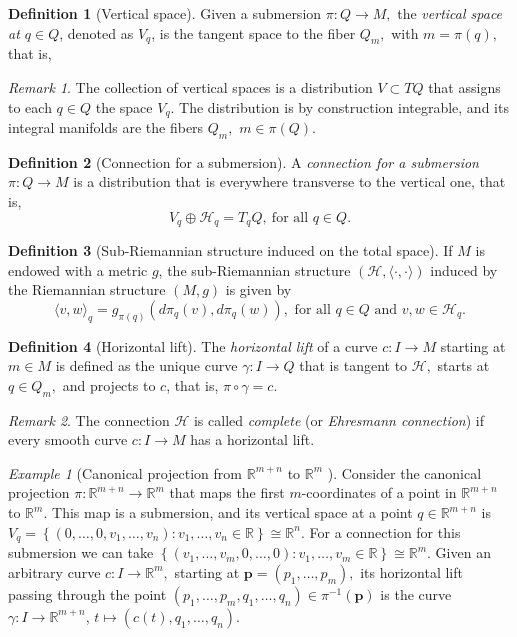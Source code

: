 \documentclass [xcolor=svgnames, t] {beamer}
\theoremstyle{definition}
\newtheorem{df}{Definition}
\theoremstyle{plain}
\theoremstyle{remark}
\newtheorem{ex}{Example}
\newtheorem{rem}{Remark}
\begin{document}
\begin{frame}[allowframebreaks]
	\begin{df}[Vertical space]
	Given a submersion $ \pi:Q \rightarrow {M}, $ the \textit{vertical space at $ q\in Q $}, denoted as $ V_q $, is the tangent space to the fiber $ Q_m, $ with $ m=\pi(q), $ that is,  
	\end{df}
	\begin{rem}
The collection of vertical spaces is a distribution $ V \subset TQ $ that assigns to each $ q\in Q $ the space $ V_q. $ The distribution is by construction integrable, and its integral manifolds are the fibers $ Q_m, $ $ m\in \pi(Q). $ 
	\end{rem}
	\begin{df}[Connection for a submersion]
	A \textit{connection for a submersion} $ \pi:Q \rightarrow {M} $ is a distribution that is everywhere transverse to the vertical one, that is,  
	$$ V_q \oplus \mathcal{H}_q = T_q Q,\ \text{for all } q\in Q. $$ 
	\end{df}
	\begin{df}[Sub-Riemannian structure induced on the total space]
	If $ M $ is endowed with a metric $ g $, the sub-Riemannian structure $ (\mathcal{H},\langle \cdot, \cdot\rangle) $ induced by the Riemannian structure $ (M,g) $ is given by
$$ \langle v,w \rangle_q = g_{\pi(q)} \left( d\pi_q(v), d\pi_q(w) \right), \text{ for all }q\in Q \text{ and } v,w\in \mathcal{H}_q.   $$ 
	\end{df}
	\begin{df}[Horizontal lift]
	The \textit{horizontal lift} of a curve $ c: I \rightarrow {M} $ starting at $ m\in M $ is defined as the unique curve $ \gamma : I \rightarrow {Q} $ that is tangent to $ \mathcal{H}, $ starts at $ q\in Q_m, $ and projects to $c$, that is, $ \pi\circ\gamma = c. $ 
	\end{df}
\begin{rem}
	The connection $ \mathcal{H} $ is called \textit{complete} (or \textit{Ehresmann connection})  if every smooth curve $ c: I \rightarrow {M} $ has a horizontal lift.
\end{rem}
\begin{ex}[Canonical projection from $ \mathbb{R}^{m+n} $ to $ \mathbb{R}^m $  ]\label{ex:can_proj}
	\sloppy	Consider the canonical projection $ \pi: \mathbb{R}^{m+n} \rightarrow \mathbb{R}^m $ that maps the first $ m $-coordinates of a point in $ \mathbb{R}^{m+n} $  to $ \mathbb{R}^m. $ This map is a submersion, and its vertical space at a point $ q\in \mathbb{R}^{m+n} $ is $ V_q = \left\{ (0,\dots,0,v_1,\dots,v_n) : v_1,\dots,v_n\in \mathbb{R}  \right\} \cong \mathbb{R}^n. $ For a connection for this submersion we can take $ \left\{ (v_1,\dots,v_m, 0,\dots, 0): v_1,\dots,v_m\in \mathbb{R} \right\}\cong \mathbb{R}^m.  $ Given an arbitrary curve $ c: I \rightarrow \mathbb{R}^m, $ starting at $ \boldsymbol{p}= (p_1,\dots,p_m), $ its horizontal lift passing through the point $ (p_1,\dots,p_m,q_1,\dots,q_n)\in \pi^{-1}( \boldsymbol{p} ) $ is the curve $ \gamma: I \rightarrow \mathbb{R}^{m+n} $, $ t\mapsto (c(t),q_1,\dots,q_n). $   

\end{ex}
\end{frame}
\end{document}
